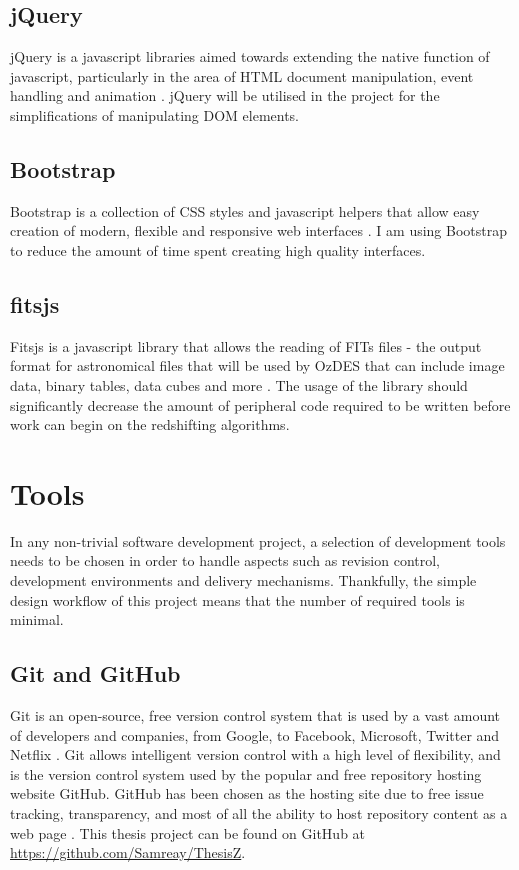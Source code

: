 \documentclass[titlesmallcaps, examinerscopy, copyrightpage]{uqthesis}
\begin{document}
\subsection{jQuery}

jQuery is a javascript libraries aimed towards extending the native function of javascript, particularly in the area of HTML document manipulation, event handling and animation \cite{jQuery}. jQuery will be utilised in the project for the simplifications of manipulating DOM elements.

\subsection{Bootstrap}

Bootstrap is a collection of CSS styles and javascript helpers that allow easy creation of modern, flexible and responsive web interfaces \cite{bootstrap}. I am using Bootstrap to reduce the amount of time spent creating high quality interfaces.


\subsection{fitsjs}

Fitsjs is a javascript library that allows the reading of FITs files - the output format for astronomical files that will be used by OzDES that can include image data, binary tables, data cubes and more \cite{fitsjs}. The usage of the library should significantly decrease the amount of peripheral code required to be written before work can begin on the redshifting algorithms.


\section{Tools}

In any non-trivial software development project, a selection of development tools needs to be chosen in order to handle aspects such as revision control, development environments and delivery mechanisms. Thankfully, the simple design workflow of this project means that the number of required tools is minimal.

\subsection{Git and GitHub}

Git is an open-source, free version control system that is used by a vast amount of developers and companies, from Google, to Facebook, Microsoft, Twitter and Netflix \cite{git}. Git allows intelligent version control with a high level of flexibility, and is the version control system used by the popular and free repository hosting website GitHub. GitHub has been chosen as the hosting site due to free issue tracking, transparency, and most of all the ability to host repository content as a web page \cite{GitHub}. This thesis project can be found on GitHub at \url{https://github.com/Samreay/ThesisZ}.
\end{document}
